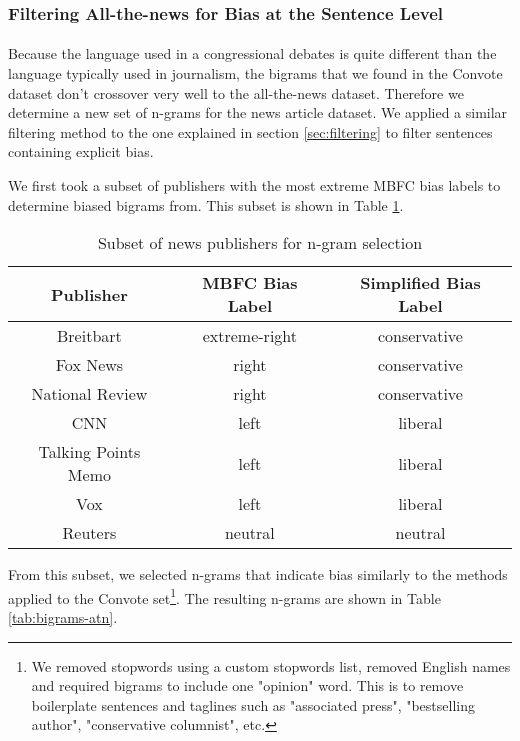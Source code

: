 \documentclass[10pt,a4paper,onecolumn]{article}
\begin{document}
\subsubsection{Filtering All-the-news for Bias at the Sentence Level}
\label{sec:filtering2}
\paragraph{}
Because the language used in a congressional debates is quite different than the language typically used in journalism, the bigrams that we found in the Convote dataset don't crossover very well to the all-the-news dataset. Therefore we determine a new set of n-grams for the news article dataset. We applied a similar filtering method to the one explained in section \ref{sec:filtering} to filter sentences containing explicit bias.

We first took a subset of publishers with the most extreme MBFC bias labels to determine biased bigrams from. This subset is shown in Table \ref{tab:biasBigramSubset}.

\begin{table}[h!]
	\begin{center}
		\caption{Subset of news publishers for n-gram selection}
		\label{tab:biasBigramSubset}
		\begin{tabular}{c|c|c}
			\hline\hline
			\textbf{Publisher} & \textbf{MBFC Bias Label} & \textbf{Simplified Bias Label} \\
			\hline
			Breitbart & extreme-right & conservative \\
			Fox News & right & conservative \\
			National Review & right & conservative \\
			CNN & left & liberal \\
			Talking Points Memo & left & liberal \\
			Vox & left & liberal \\
			Reuters & neutral & neutral \\
			\hline\hline
		\end{tabular}
	\end{center}
\end{table}

From this subset, we selected n-grams that indicate bias similarly to the methods applied to the Convote set\footnote{We removed stopwords using a custom stopwords list, removed English names and required bigrams to include one "opinion" word. This is to remove boilerplate sentences and taglines such as "associated press", "bestselling author", "conservative columnist", etc.}. The resulting n-grams are shown in Table \ref{tab:bigrams-atn}. 
\end{document}
